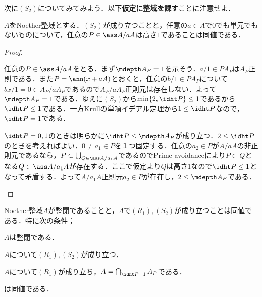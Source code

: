 次に$(S_2)$についてみてみよう．以下\textbf{仮定に整域を課す}ことに注意せよ．

\begin{lem}
	$A$をNoether整域とする．$(S_2)$が成り立つことと，任意の$a\in A$で$0$でも単元でもないものについて，任意の$P\in\ass A/aA$は高さ$1$であることは同値である．
\end{lem}

\begin{proof}
	\begin{eqv}
		\item 任意の$P\in\ass A/aA$をとる．まず$\mdepth A_P=1$を示そう．$a/1\in PA_P$は$A_P$正則である．また$P=\ann (x+aA)$とおくと，任意の$b/1\in PA_P$について$bx/1=0\in A_P/aA_P$であるので$A_P/aA_P$正則元は存在しない．よって$\mdepth A_P=1$である．ゆえに$(S_2)$から$\min\{2,\idht P\}\leq1$であるから$\idht P\leq1$である．一方Krullの単項イデアル定理から$1\leq\idht P$なので，$\idht P=1$である．
		\item $\idht P=0,1$のときは明らかに$\idht P\leq\mdepth A_P$が成り立つ．$2\leq\idht P$のときを考えればよい．$0\neq a_1\in P$を１つ固定する．任意の$a_2\in P$が$A/aA$の非正則元であるなら，$P\subset\bigcup_{Q\in\ass A/a_1A}$であるのでPrime avoidanceにより$P\subset Q$となる$Q\in\ass A/a_1A$が存在する．ここで仮定より$Q$は高さ1なので$\idht P\leq1$となって矛盾する．よって$A/a_1A$正則元$a_2\in P$が存在し，$2\leq\mdepth A_P$である．
	\end{eqv}
\end{proof}

\begin{thm}\label{thm:Serre's condition}
	Noether整域$A$が整閉であることと，$A$で$(R_1),(S_2)$が成り立つことは同値である．特に次の条件；
	\begin{sakura}
		\item $A$は整閉である．
		\item $A$について$(R_1),(S_2)$が成り立つ．
		\item $A$について$(R_1)$が成り立ち，$A=\bigcap_{\idht P=1}A_P$である．
	\end{sakura}
	は同値である．
\end{thm}

